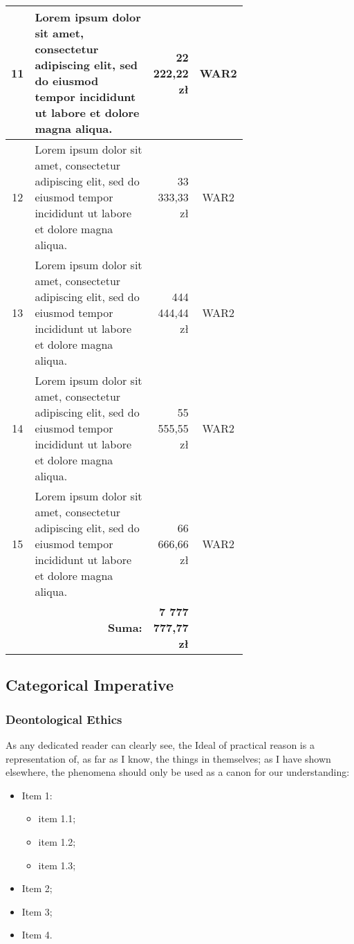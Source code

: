 \begin{longtable}{| c | m{0.58\linewidth} | r | m{0.1\linewidth} |}
    11 & Lorem ipsum dolor sit amet, consectetur adipiscing elit, sed do eiusmod tempor incididunt ut labore et dolore magna aliqua. & 22 222,22 zł & \multicolumn{1}{c|}{WAR2} \\ \hline
    12 & Lorem ipsum dolor sit amet, consectetur adipiscing elit, sed do eiusmod tempor incididunt ut labore et dolore magna aliqua. & 33 333,33 zł & \multicolumn{1}{c|}{WAR2} \\ \hline
    13 & Lorem ipsum dolor sit amet, consectetur adipiscing elit, sed do eiusmod tempor incididunt ut labore et dolore magna aliqua. & 444 444,44 zł & \multicolumn{1}{c|}{WAR2} \\ \hline
    14 & Lorem ipsum dolor sit amet, consectetur adipiscing elit, sed do eiusmod tempor incididunt ut labore et dolore magna aliqua. & 55 555,55 zł & \multicolumn{1}{c|}{WAR2} \\ \hline
    15 & Lorem ipsum dolor sit amet, consectetur adipiscing elit, sed do eiusmod tempor incididunt ut labore et dolore magna aliqua. & 66 666,66 zł & \multicolumn{1}{c|}{WAR2} \\ \hline
    & \multicolumn{1}{r|}{\textbf{Suma:}} & \textbf{7 777 777,77 zł} &
    \label{table:koszty}
\end{longtable}
\kant[4]

\subsection{Categorical Imperative}
\subsubsection{Deontological Ethics}
As any dedicated reader can clearly see, the Ideal of practical reason is a representation of, as far as I know, the things in themselves; as I have shown elsewhere, the phenomena should only be used as a canon for our understanding:
\begin{itemize}
    \item Item 1:
    \begin{itemize}[label=---]
        \item item 1.1;
        \item item 1.2;
        \item item 1.3;
    \end{itemize}
    \item Item 2;
    \item Item 3;
    \item Item 4.
\end{itemize}
\kant[2]

